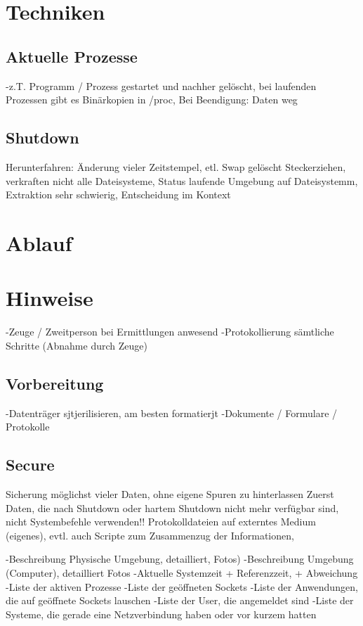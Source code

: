 \section{Techniken}
\subsection{Aktuelle Prozesse}
-z.T. Programm / Prozess gestartet und nachher gelöscht, bei laufenden Prozessen gibt es Binärkopien in /proc, Bei Beendigung: Daten weg

\subsection{Shutdown}
Herunterfahren: Änderung vieler Zeitstempel, etl. Swap gelöscht
Steckerziehen, verkraften nicht alle Dateisysteme, Status laufende Umgebung auf Dateisystemm, Extraktion sehr schwierig, Entscheidung im Kontext
\section{Ablauf}


\section{Hinweise}
-Zeuge / Zweitperson bei Ermittlungen anwesend
-Protokollierung sämtliche Schritte (Abnahme durch Zeuge)

\subsection{Vorbereitung}
-Datenträger sjtjerilisieren, am besten formatierjt
-Dokumente / Formulare / Protokolle

\subsection{Secure}
Sicherung möglichst vieler Daten, ohne eigene Spuren zu hinterlassen
Zuerst Daten, die nach Shutdown oder hartem Shutdown nicht mehr verfügbar sind, nicht Systembefehle verwenden!!
Protokolldateien auf externtes Medium (eigenes), evtl. auch Scripte zum Zusammenzug der Informationen, 


-Beschreibung Physische Umgebung, detailliert, Fotos)
-Beschreibung Umgebung (Computer), detailliert Fotos
-Aktuelle Systemzeit + Referenzzeit, + Abweichung
-Liste der aktiven Prozesse
-Liste der geöffneten Sockets
-Liste der Anwendungen, die auf geöffnete Sockets lauschen
-Liste der User, die angemeldet sind
-Liste der Systeme, die gerade eine Netzverbindung haben oder vor kurzem hatten

